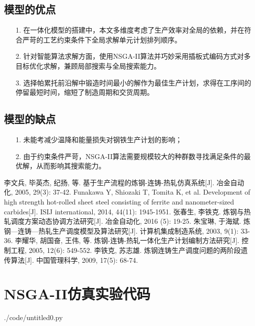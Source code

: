 \documentclass{whutmod}
\begin{document}
		\subsection{模型的优点}
			\begin{itemize}                                             
			\item [1.]在一体化模型的搭建中，本文多维度考虑了生产效率对全局的依赖，并在符合严苛的工艺约束条件下全局求解单元计划排列顺序。
			\item [2.] 	针对智能算法求解方面，使用NSGA-II算法并巧妙采用插板式编码方式对多目标优化求解，兼顾局部搜索与全局搜索能力。
			\item [3.] 选择帕累托前沿解中锻造时间最小的解作为最佳生产计划，求得在工序间的停留最短时间，缩短了制造周期和交货周期。
			\end{itemize}
		
		\subsection{模型的缺点}
					\begin{itemize}                                             
			\item [1.]未能考减少温降和能量损失对钢铁生产计划的影响；
			\item [2.] 	由于约束条件严苛，NSGA-II算法需要规模较大的种群数寻找满足条件的最优解，从而影响其搜索能力。
		\end{itemize}
	

 
	\nocite{*}		%
	\begin{thebibliography}{9}%
		李文兵, 毕英杰, 纪扬, 等. 基于生产流程的炼钢-连铸-热轧仿真系统[J]. 冶金自动化, 2005, 29(3): 37-42.
		Funakawa Y, Shiozaki T, Tomita K, et al. Development of high strength hot-rolled sheet steel consisting of ferrite and nanometer-sized carbides[J]. ISIJ international, 2014, 44(11): 1945-1951.
		张春生, 李铁克. 炼钢与热轧调度方案动态协调方法研究[J]. 冶金自动化, 2016 (5): 19-25.
		朱宝琳, 于海斌. 炼钢—连铸—热轧生产调度模型及算法研究[J]. 计算机集成制造系统, 2003, 9(1): 33-36.
		李耀华, 胡国奋, 王伟, 等. 炼钢-连铸-热轧一体化生产计划编制方法研究[J]. 控制工程, 2005, 12(6): 549-552.
		李铁克, 苏志雄. 炼钢连铸生产调度问题的两阶段遗传算法[J]. 中国管理科学, 2009, 17(5): 68-74.
	\end{thebibliography}

	\newpage
	\appendix %
	\section{NSGA-II仿真实验代码}

			 {./code/untitled0.py}
\end{document}
